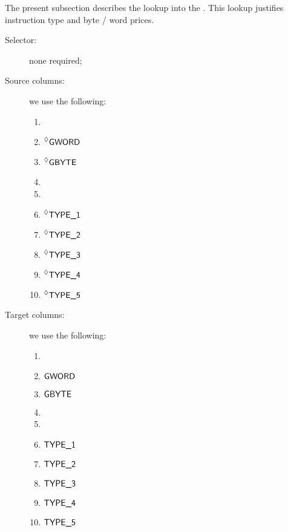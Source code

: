 The present subsection describes the lookup into the \idMod{}. This lookup justifies instruction type and byte / word prices.
\begin{description}
	\item[Selector:] none required;
	\item[Source columns:] we use the following:
		\begin{multicols}{2}
			\begin{enumerate}
				\item \INST{}
				\item $\prescript{\lozenge}{}{\textsf{GWORD}}$
				\item $\prescript{\lozenge}{}{\textsf{GBYTE}}$
				\item[\vspace{\fill}]
				\item[\vspace{\fill}]
				\item $\prescript{\lozenge}{}{\textsf{TYPE\_1}}$
				\item $\prescript{\lozenge}{}{\textsf{TYPE\_2}}$
				\item $\prescript{\lozenge}{}{\textsf{TYPE\_3}}$
				\item $\prescript{\lozenge}{}{\textsf{TYPE\_4}}$
				\item $\prescript{\lozenge}{}{\textsf{TYPE\_5}}$
			\end{enumerate}
		\end{multicols}
	\item[Target columns:] we use the following:
		\begin{multicols}{2}
			\begin{enumerate}
				\item \INST{}
				\item $\textsf{GWORD}$
				\item $\textsf{GBYTE}$
				\item[\vspace{\fill}]
				\item[\vspace{\fill}]
				\item $\textsf{TYPE\_1}$
				\item $\textsf{TYPE\_2}$
				\item $\textsf{TYPE\_3}$
				\item $\textsf{TYPE\_4}$
				\item $\textsf{TYPE\_5}$
			\end{enumerate}
		\end{multicols}
\end{description}

